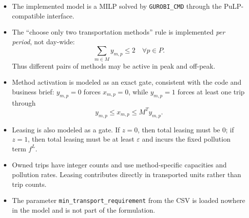 \begin{itemize}
    \item The implemented model is a MILP solved by \texttt{GUROBI\_CMD} through the PuLP-compatible interface.
    \item The ``choose only two transportation methods'' rule is implemented \emph{per period}, not day-wide:
    \[
    \sum_{m \in M} y_{m,p} \le 2 \quad \forall p \in P.
    \]
    Thus different pairs of methods may be active in peak and off-peak.
    \item Method activation is modeled as an exact gate, consistent with the code and business brief: $y_{m,p}=0$ forces $x_{m,p}=0$, while $y_{m,p}=1$ forces at least one trip through
    \[
    y_{m,p} \le x_{m,p} \le M^{T} y_{m,p}.
    \]
    \item Leasing is also modeled as a gate. If $z=0$, then total leasing must be $0$; if $z=1$, then total leasing must be at least $\varepsilon$ and incurs the fixed pollution term $f^L$.
    \item Owned trips have integer counts and use method-specific capacities and pollution rates. Leasing contributes directly in transported units rather than trip counts.
    \item The parameter \texttt{min\_transport\_requirement} from the CSV is loaded nowhere in the model and is not part of the formulation.
\end{itemize}

